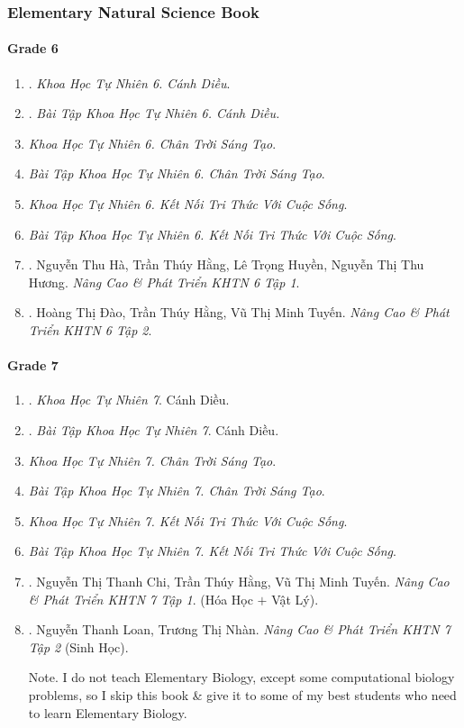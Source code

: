 \documentclass{article}
\begin{document}
\subsubsection{Elementary Natural Science Book}

\paragraph{Grade 6}

\begin{enumerate}
	\item \cite{SGK_KHTN_6_Canh_Dieu}. {\it Khoa Học Tự Nhiên 6. Cánh Diều}.\hfill{\sf[done]}
	\item \cite{SBT_KHTN_6_Canh_Dieu}. {\it Bài Tập Khoa Học Tự Nhiên 6. Cánh Diều.}\hfill{\sf[done]}
	\item {\it Khoa Học Tự Nhiên 6. Chân Trời Sáng Tạo}.
	\item {\it Bài Tập Khoa Học Tự Nhiên 6. Chân Trời Sáng Tạo}.
	\item {\it Khoa Học Tự Nhiên 6. Kết Nối Tri Thức Với Cuộc Sống}.
	\item {\it Bài Tập Khoa Học Tự Nhiên 6. Kết Nối Tri Thức Với Cuộc Sống}.
	\item \cite{ncpt_KHTN_6_tap_1}. {\sc Nguyễn Thu Hà, Trần Thúy Hằng, Lê Trọng Huyền, Nguyễn Thị Thu Hương}. {\it Nâng Cao \& Phát Triển KHTN 6 Tập 1}.\hfill{\sf[done]}
	\item \cite{ncpt_KHTN_6_tap_2}. {\sc Hoàng Thị Đào, Trần Thúy Hằng, Vũ Thị Minh Tuyến}. {\it Nâng Cao \& Phát Triển KHTN 6 Tập 2}.\hfill{\sf[done]}
\end{enumerate}

\paragraph{Grade 7}

\begin{enumerate}	
	\item \cite{SGK_KHTN_7_Canh_Dieu}. {\it Khoa Học Tự Nhiên 7}. Cánh Diều.\hfill{\sf[done]}
	\item \cite{SBT_KHTN_7_Canh_Dieu}. {\it Bài Tập  Khoa Học Tự Nhiên 7}. Cánh Diều.\hfill{\sf[done]}
	\item {\it Khoa Học Tự Nhiên 7. Chân Trời Sáng Tạo}.
	\item {\it Bài Tập Khoa Học Tự Nhiên 7. Chân Trời Sáng Tạo}.
	\item {\it Khoa Học Tự Nhiên 7. Kết Nối Tri Thức Với Cuộc Sống}.
	\item {\it Bài Tập Khoa Học Tự Nhiên 7. Kết Nối Tri Thức Với Cuộc Sống}.
	\item \cite{ncpt_KHTN_7_tap_1}. Nguyễn Thị Thanh Chi, Trần Thúy Hằng, Vũ Thị Minh Tuyến. {\it Nâng Cao \& Phát Triển KHTN 7 Tập 1}. (Hóa Học $+$ Vật Lý).\hfill{\sf[done]}
	\item \cite{ncpt_KHTN_7_tap_2}. Nguyễn Thanh Loan, Trương Thị Nhàn. {\it Nâng Cao \& Phát Triển KHTN 7 Tập 2} (Sinh Học).\hfill{\sf[done]}
	
	{\sf Note.} I do not teach Elementary Biology, except some computational biology problems, so I skip this book \& give it to some of my best students who need to learn Elementary Biology.
\end{enumerate}
\end{document}
